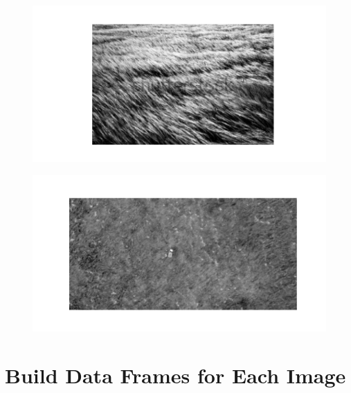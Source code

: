 \documentclass[
  letterpaper,
]{report}
\begin{document}
\begin{figure}[H]

{\centering \includegraphics{results_files/figure-pdf/unnamed-chunk-5-3.pdf}

}

\end{figure}

\begin{figure}[H]

{\centering \includegraphics{results_files/figure-pdf/unnamed-chunk-5-4.pdf}

}

\end{figure}

\hypertarget{build-data-frames-for-each-image}{%
\section{Build Data Frames for Each
Image}\label{build-data-frames-for-each-image}}
\end{document}
